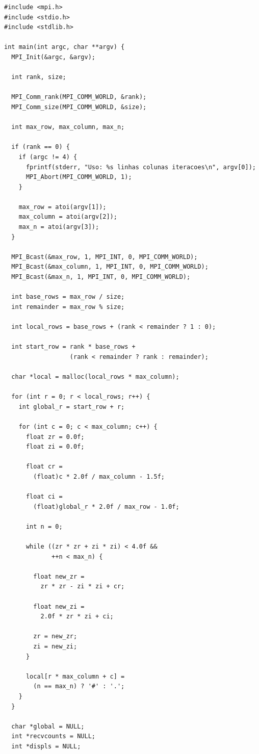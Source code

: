 \documentclass[
    12pt,
    oneside,
    a4paper,
    brazil
]{abntex2}
\begin{document}
\begin{verbatim}
#include <mpi.h>
#include <stdio.h>
#include <stdlib.h>

int main(int argc, char **argv) {
  MPI_Init(&argc, &argv);

  int rank, size;

  MPI_Comm_rank(MPI_COMM_WORLD, &rank);
  MPI_Comm_size(MPI_COMM_WORLD, &size);

  int max_row, max_column, max_n;

  if (rank == 0) {
    if (argc != 4) {
      fprintf(stderr, "Uso: %s linhas colunas iteracoes\n", argv[0]);
      MPI_Abort(MPI_COMM_WORLD, 1);
    }

    max_row = atoi(argv[1]);
    max_column = atoi(argv[2]);
    max_n = atoi(argv[3]);
  }

  MPI_Bcast(&max_row, 1, MPI_INT, 0, MPI_COMM_WORLD);
  MPI_Bcast(&max_column, 1, MPI_INT, 0, MPI_COMM_WORLD);
  MPI_Bcast(&max_n, 1, MPI_INT, 0, MPI_COMM_WORLD);

  int base_rows = max_row / size;
  int remainder = max_row % size;

  int local_rows = base_rows + (rank < remainder ? 1 : 0);

  int start_row = rank * base_rows +
                  (rank < remainder ? rank : remainder);

  char *local = malloc(local_rows * max_column);

  for (int r = 0; r < local_rows; r++) {
    int global_r = start_row + r;

    for (int c = 0; c < max_column; c++) {
      float zr = 0.0f;
      float zi = 0.0f;

      float cr =
        (float)c * 2.0f / max_column - 1.5f;

      float ci =
        (float)global_r * 2.0f / max_row - 1.0f;

      int n = 0;

      while ((zr * zr + zi * zi) < 4.0f &&
             ++n < max_n) {

        float new_zr =
          zr * zr - zi * zi + cr;

        float new_zi =
          2.0f * zr * zi + ci;

        zr = new_zr;
        zi = new_zi;
      }

      local[r * max_column + c] =
        (n == max_n) ? '#' : '.';
    }
  }

  char *global = NULL;
  int *recvcounts = NULL;
  int *displs = NULL;


\end{verbatim}
\end{document}
